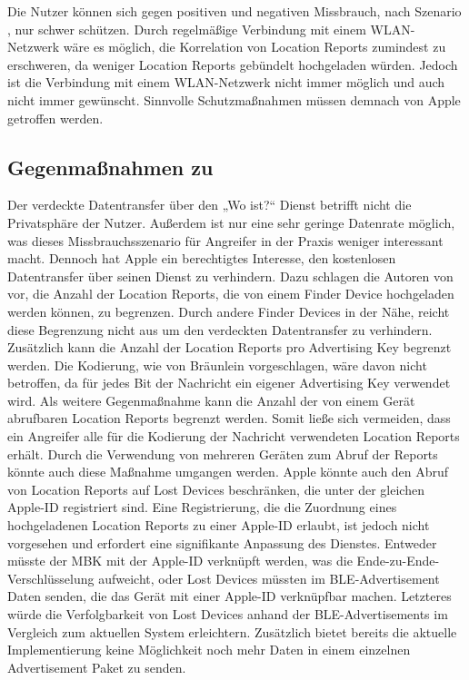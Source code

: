 Die Nutzer können sich gegen positiven und negativen Missbrauch, nach Szenario , nur schwer schützen.
Durch regelmäßige Verbindung mit einem WLAN-Netzwerk wäre es möglich, die Korrelation von Location Reports zumindest zu erschweren, da weniger Location Reports gebündelt hochgeladen würden. 
Jedoch ist die Verbindung mit einem WLAN-Netzwerk nicht immer möglich und auch nicht immer gewünscht.
Sinnvolle Schutzmaßnahmen müssen demnach von Apple getroffen werden.


\subsection{Gegenmaßnahmen zu }
Der verdeckte Datentransfer über den „Wo ist?“ Dienst betrifft nicht die Privatsphäre der Nutzer.
Außerdem ist nur eine sehr geringe Datenrate möglich, was dieses Missbrauchsszenario für Angreifer in der Praxis weniger interessant macht.
Dennoch hat Apple ein berechtigtes Interesse, den kostenlosen Datentransfer über seinen Dienst zu verhindern.
Dazu schlagen die Autoren von \cite{Tonetto_FindMy} vor, die Anzahl der Location Reports, die von einem Finder Device hochgeladen werden können, zu begrenzen.
Durch andere Finder Devices in der Nähe, reicht diese Begrenzung nicht aus um den verdeckten Datentransfer zu verhindern.
Zusätzlich kann die Anzahl der Location Reports pro Advertising Key begrenzt werden.
Die Kodierung, wie von Bräunlein \cite{braeunlein_sendmy} vorgeschlagen, wäre davon nicht betroffen, da für jedes Bit der Nachricht ein eigener Advertising Key verwendet wird.
Als weitere Gegenmaßnahme kann die Anzahl der von einem Gerät abrufbaren Location Reports begrenzt werden.
Somit ließe sich vermeiden, dass ein Angreifer alle für die Kodierung der Nachricht verwendeten Location Reports erhält.
Durch die Verwendung von mehreren Geräten zum Abruf der Reports könnte auch diese Maßnahme umgangen werden.
Apple könnte auch den Abruf von Location Reports auf Lost Devices beschränken, die unter der gleichen Apple-ID registriert sind.
Eine Registrierung, die die Zuordnung eines hochgeladenen Location Reports zu einer Apple-ID erlaubt, ist jedoch nicht vorgesehen und erfordert eine signifikante Anpassung des Dienstes.
Entweder müsste der \ac{MBK} mit der Apple-ID verknüpft werden, was die Ende-zu-Ende-Verschlüsselung aufweicht, oder Lost Devices müssten im \ac{BLE}-Advertisement Daten senden, die das Gerät mit einer Apple-ID verknüpfbar machen.
Letzteres würde die Verfolgbarkeit von Lost Devices anhand der \ac{BLE}-Advertisements im Vergleich zum aktuellen System erleichtern.
Zusätzlich bietet bereits die aktuelle Implementierung keine Möglichkeit noch mehr Daten in einem einzelnen Advertisement Paket zu senden.

